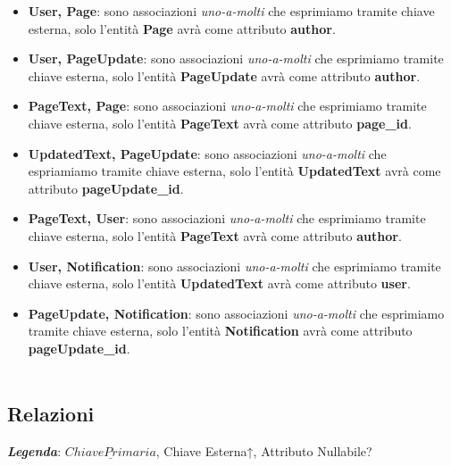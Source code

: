 \documentclass{article}
\begin{document}
	\begin{itemize}
		\item \textbf{User, Page}: sono associazioni {\itshape{uno-a-molti}} che esprimiamo tramite chiave esterna, solo l'entit\`a \textbf{Page} avr\`a come attributo \textbf{author}.
		\item \textbf{User, PageUpdate}: sono associazioni {\itshape{uno-a-molti}} che esprimiamo tramite chiave esterna, solo l'entit\`a \textbf{PageUpdate} avr\`a come attributo \textbf{author}.
		\item \textbf{PageText, Page}: sono associazioni {\itshape{uno-a-molti}} che esprimiamo tramite chiave esterna, solo l'entit\`a \textbf{PageText} avr\`a come attributo \textbf{page\_id}.
		\item \textbf{UpdatedText, PageUpdate}: sono associazioni {\itshape{uno-a-molti}} che espriamiamo tramite chiave esterna, solo l'entit\`a \textbf{UpdatedText} avr\`a come attributo \textbf{pageUpdate\_id}.
		\item \textbf{PageText, User}: sono associazioni {\itshape{uno-a-molti}} che esprimiamo tramite chiave esterna, solo l'entit\`a \textbf{PageText} avr\`a come attributo \textbf{author}.
		\item \textbf{User, Notification}: sono associazioni {\itshape{uno-a-molti}} che esprimiamo tramite chiave esterna, solo l'entit\`a \textbf{UpdatedText} avr\`a come attributo \textbf{user}.
		\item \textbf{PageUpdate, Notification}: sono associazioni {\itshape{uno-a-molti}} che esprimiamo tramite chiave esterna, solo l'entit\`a \textbf{Notification} avr\`a come attributo \textbf{pageUpdate\_id}.
		\\\\
	\end{itemize}
	
	\subsection{Relazioni}
	\textbf{{\itshape{Legenda}}}: $\underline{Chiave Primaria}$, Chiave Esterna↑, Attributo Nullabile?
	
\end{document}

